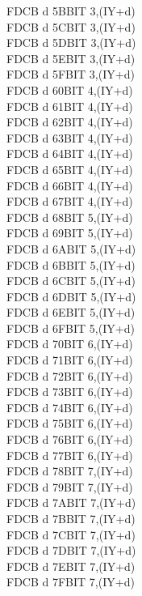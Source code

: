 \begin{multicols}{3}
{\begin{tabbing}
	FDCB d 5B\>BIT 3,(IY+d)\UNDOC\\
	FDCB d 5C\>BIT 3,(IY+d)\UNDOC\\
	FDCB d 5D\>BIT 3,(IY+d)\UNDOC\\
	FDCB d 5E\>BIT 3,(IY+d)\\
	FDCB d 5F\>BIT 3,(IY+d)\UNDOC\\
	FDCB d 60\>BIT 4,(IY+d)\UNDOC\\
	FDCB d 61\>BIT 4,(IY+d)\UNDOC\\
	FDCB d 62\>BIT 4,(IY+d)\UNDOC\\
	FDCB d 63\>BIT 4,(IY+d)\UNDOC\\
	FDCB d 64\>BIT 4,(IY+d)\UNDOC\\
	FDCB d 65\>BIT 4,(IY+d)\UNDOC\\
	FDCB d 66\>BIT 4,(IY+d)\\
	FDCB d 67\>BIT 4,(IY+d)\UNDOC\\
	FDCB d 68\>BIT 5,(IY+d)\UNDOC\\
	FDCB d 69\>BIT 5,(IY+d)\UNDOC\\
	FDCB d 6A\>BIT 5,(IY+d)\UNDOC\\
	FDCB d 6B\>BIT 5,(IY+d)\UNDOC\\
	FDCB d 6C\>BIT 5,(IY+d)\UNDOC\\
	FDCB d 6D\>BIT 5,(IY+d)\UNDOC\\
	FDCB d 6E\>BIT 5,(IY+d)\\
	FDCB d 6F\>BIT 5,(IY+d)\UNDOC\\
	FDCB d 70\>BIT 6,(IY+d)\UNDOC\\
	FDCB d 71\>BIT 6,(IY+d)\UNDOC\\
	FDCB d 72\>BIT 6,(IY+d)\UNDOC\\
	FDCB d 73\>BIT 6,(IY+d)\UNDOC\\
	FDCB d 74\>BIT 6,(IY+d)\UNDOC\\
	FDCB d 75\>BIT 6,(IY+d)\UNDOC\\
	FDCB d 76\>BIT 6,(IY+d)\\
	FDCB d 77\>BIT 6,(IY+d)\UNDOC\\
	FDCB d 78\>BIT 7,(IY+d)\UNDOC\\
	FDCB d 79\>BIT 7,(IY+d)\UNDOC\\
	FDCB d 7A\>BIT 7,(IY+d)\UNDOC\\
	FDCB d 7B\>BIT 7,(IY+d)\UNDOC\\
	FDCB d 7C\>BIT 7,(IY+d)\UNDOC\\
	FDCB d 7D\>BIT 7,(IY+d)\UNDOC\\
	FDCB d 7E\>BIT 7,(IY+d)\\
	FDCB d 7F\>BIT 7,(IY+d)\UNDOC\\

\end{tabbing}}
\end{multicols}
